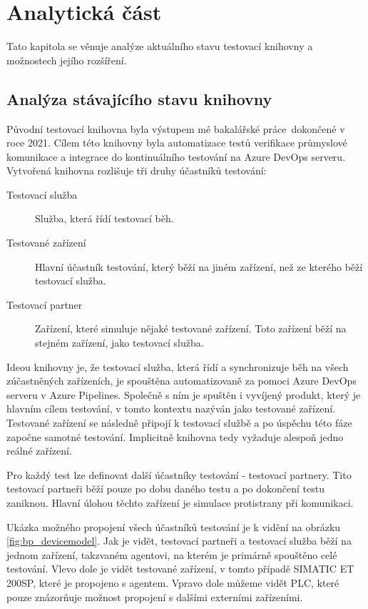 \chapter{Analytická část}\label{chap:anal}

Tato kapitola se věnuje analýze aktuálního stavu testovací knihovny a možnostech jejího rozšíření.

\section{Analýza stávajícího stavu knihovny}

Původní testovací knihovna byla výstupem mé bakalářské práce\,\cite{bakalarka} dokončené v roce 2021. Cílem této knihovny byla automatizace testů verifikace průmyslové komunikace a integrace do kontinuálního testování na Azure DevOps serveru. Vytvořená knihovna rozlišuje tři druhy účastníků testování:

\begin{description}
    \item[Testovací služba] Služba, která řídí testovací běh.
    \item[Testované zařízení] Hlavní účastník testování, který běží na jiném zařízení, než ze kterého běží testovací služba. 
    \item[Testovací partner] Zařízení, které simuluje nějaké testované zařízení. Toto zařízení běží na stejném zařízení, jako testovací služba. 
\end{description}

Ideou knihovny je, že testovací služba, která řídí a synchronizuje běh na všech zúčastněných zařízeních, je spouštěna automatizovaně za pomoci Azure DevOps serveru v Azure Pipelines. Společně s ním je spuštěn i vyvíjený produkt, který je hlavním cílem testování, v tomto kontextu nazýván jako testované zařízení. Testované zařízení se následně připojí k testovací službě a po úspěchu této fáze započne samotné testování. Implicitně knihovna tedy vyžaduje alespoň jedno reálné zařízení. 

Pro každý test lze definovat další účastníky testování - testovací partnery. Tito testovací partneři běží pouze po dobu daného testu a po dokončení testu zaniknou. Hlavní úlohou těchto zařízení je simulace protistrany při komunikaci. 

Ukázka možného propojení všech účastníků testování je k vidění na obrázku \ref{fig:bp_devicemodel}. Jak je vidět, testovací partneři a testovací služba běží na jednom zařízení, takzvaném agentovi, na kterém je primárně spouštěno celé testování. Vlevo dole je vidět testované zařízení, v tomto případě SIMATIC ET 200SP, které je propojeno s agentem. Vpravo dole můžeme vidět PLC, které pouze znázorňuje možnost propojení s dalšími externími zařízeními.

